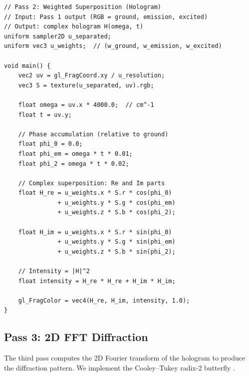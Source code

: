 \documentclass[11pt,a4paper]{article}
\theoremstyle{definition}
\theoremstyle{remark}
\begin{document}
\begin{lstlisting}[style=glsl, caption={Pass 2: Weighted superposition shader}, label={lst:pass2}]
// Pass 2: Weighted Superposition (Hologram)
// Input: Pass 1 output (RGB = ground, emission, excited)
// Output: complex hologram H(omega, t)
uniform sampler2D u_separated;
uniform vec3 u_weights;  // (w_ground, w_emission, w_excited)

void main() {
    vec2 uv = gl_FragCoord.xy / u_resolution;
    vec3 S = texture(u_separated, uv).rgb;

    float omega = uv.x * 4000.0;  // cm^-1
    float t = uv.y;

    // Phase accumulation (relative to ground)
    float phi_0 = 0.0;
    float phi_em = omega * t * 0.01;
    float phi_2 = omega * t * 0.02;

    // Complex superposition: Re and Im parts
    float H_re = u_weights.x * S.r * cos(phi_0)
               + u_weights.y * S.g * cos(phi_em)
               + u_weights.z * S.b * cos(phi_2);

    float H_im = u_weights.x * S.r * sin(phi_0)
               + u_weights.y * S.g * sin(phi_em)
               + u_weights.z * S.b * sin(phi_2);

    // Intensity = |H|^2
    float intensity = H_re * H_re + H_im * H_im;

    gl_FragColor = vec4(H_re, H_im, intensity, 1.0);
}
\end{lstlisting}

\subsection{Pass 3: 2D FFT Diffraction}

The third pass computes the 2D Fourier transform of the hologram to produce the diffraction pattern. We implement the Cooley--Tukey radix-2 butterfly \citep{cooleytukey1965}.
\end{document}
